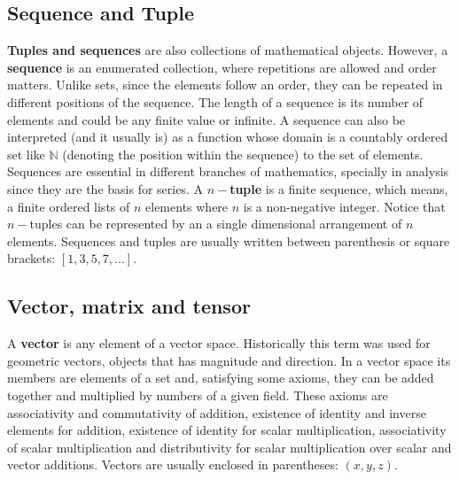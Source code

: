         \vspace{-.5cm}
        \subsection*{Sequence and Tuple}
        \vspace{-.5cm}
\textbf{Tuples and sequences} are also collections of mathematical objects.
However, a \textbf{sequence} is an enumerated collection, where repetitions are allowed and order matters.
Unlike sets, since the elements follow an order, they can be repeated in different positions of the sequence.
The length of a sequence is its number of elements and could be any finite value or infinite.
A sequence can also be interpreted (and it usually is) as a function whose domain is a countably ordered set like $\mathbb{N}$ 
(denoting the position within the sequence) to the set of elements. 
Sequences are essential in different branches of mathematics, specially in analysis since they are 
the basis for series.
A $n-$\textbf{tuple} is a finite sequence, which means, a finite ordered lists of $n$ elements where $n$ is a non-negative integer.
Notice that $n-$tuples can be represented by an a single dimensional arrangement of $n$ elements.
Sequences and tuples are usually written between parenthesis or square brackets: $[1,3,5,7,...]$.

        \vspace{-.5cm}
        \subsection*{Vector, matrix and tensor}
        \vspace{-.5cm}
A \textbf{vector} is any element of a vector space.
Historically this term was used for geometric vectors, objects that has magnitude and direction.
In a vector space its members are elements of a set and, satisfying some axioms, they can be added together and multiplied by numbers of a given field. 
These axioms are associativity and commutativity of addition, 
existence of identity and inverse elements for addition, 
existence of identity for scalar multiplication, 
associativity of scalar multiplication and 
distributivity for scalar multiplication over scalar and vector additions. 
Vectors are usually enclosed in parentheses: $(x,y,z)$.

